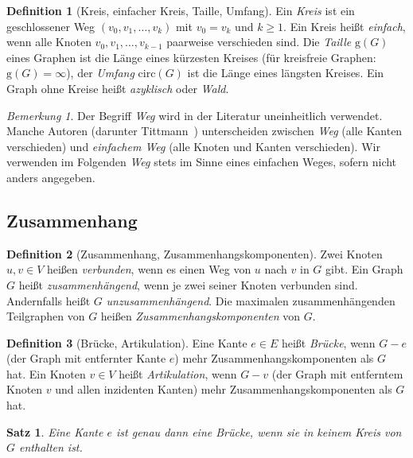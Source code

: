 ﻿\documentclass[a4paper,12pt,openany,oneside]{book}
\theoremstyle{definition}
\newtheorem{definition}{Definition}[chapter]
\theoremstyle{plain}
\newtheorem{satz}{Satz}[chapter]
\theoremstyle{remark}
\newtheorem{bemerkung}{Bemerkung}[chapter]
\begin{document}
\begin{definition}[Kreis, einfacher Kreis, Taille, Umfang]
  Ein \emph{Kreis} ist ein geschlossener Weg $(v_0, v_1, \ldots, v_k)$ mit
  $v_0 = v_k$ und $k \geq 1$. Ein Kreis hei\ss{}t \emph{einfach}, wenn alle
  Knoten $v_0, v_1, \ldots, v_{k-1}$ paarweise verschieden sind. Die
  \emph{Taille} $\mathrm{g}(G)$ eines Graphen ist die L\"ange eines k\"urzesten
  Kreises (f\"ur kreisfreie Graphen: $\mathrm{g}(G) = \infty$), der
  \emph{Umfang} $\mathrm{circ}(G)$ ist die L\"ange eines l\"angsten Kreises.
  Ein Graph ohne Kreise hei\ss{}t \emph{azyklisch} oder \emph{Wald}.
\end{definition}

\begin{bemerkung}
  Der Begriff \emph{Weg} wird in der Literatur uneinheitlich verwendet.
  Manche Autoren (darunter Tittmann~\cite{tittmann2025}) unterscheiden
  zwischen \emph{Weg} (alle Kanten verschieden) und \emph{einfachem Weg}
  (alle Knoten und Kanten verschieden). Wir verwenden im Folgenden
  \emph{Weg} stets im Sinne eines einfachen Weges, sofern nicht anders
  angegeben.
\end{bemerkung}

\subsection{Zusammenhang}

\begin{definition}[Zusammenhang, Zusammenhangskomponenten]
  Zwei Knoten $u, v \in V$ hei\ss{}en \emph{verbunden}, wenn es einen Weg von
  $u$ nach $v$ in $G$ gibt. Ein Graph $G$ hei\ss{}t \emph{zusammenh\"angend},
  wenn je zwei seiner Knoten verbunden sind. Andernfalls hei\ss{}t $G$
  \emph{unzusammenh\"angend}. Die maximalen zusammenh\"angenden Teilgraphen
  von $G$ hei\ss{}en \emph{Zusammenhangskomponenten} von $G$.
\end{definition}

\begin{definition}[Br\"ucke, Artikulation]
  Eine Kante $e \in E$ hei\ss{}t \emph{Br\"ucke}, wenn $G - e$ (der Graph mit
  entfernter Kante $e$) mehr Zusammenhangskomponenten als $G$ hat. Ein
  Knoten $v \in V$ hei\ss{}t \emph{Artikulation}, wenn $G - v$ (der Graph mit
  entferntem Knoten $v$ und allen inzidenten Kanten) mehr
  Zusammenhangskomponenten als $G$ hat.
\end{definition}

\begin{satz}
  \label{satz:brucke-kreis}
  Eine Kante $e$ ist genau dann eine Br\"ucke, wenn sie in keinem Kreis von
  $G$ enthalten ist.
\end{satz}
\end{document}
